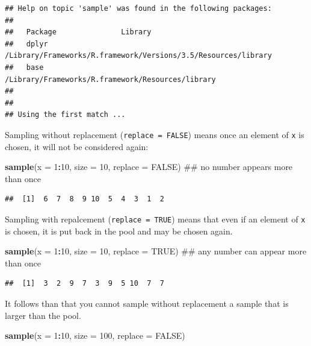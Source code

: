 \documentclass[]{book}
\newenvironment{Shaded}{\begin{snugshade}}{\end{snugshade}}
\newcommand{\KeywordTok}[1]{\textcolor[rgb]{0.13,0.29,0.53}{\textbf{#1}}}
\newcommand{\DataTypeTok}[1]{\textcolor[rgb]{0.13,0.29,0.53}{#1}}
\newcommand{\DecValTok}[1]{\textcolor[rgb]{0.00,0.00,0.81}{#1}}
\newcommand{\OtherTok}[1]{\textcolor[rgb]{0.56,0.35,0.01}{#1}}
\newcommand{\OperatorTok}[1]{\textcolor[rgb]{0.81,0.36,0.00}{\textbf{#1}}}
\newcommand{\NormalTok}[1]{#1}
\theoremstyle{definition}
\theoremstyle{definition}
\theoremstyle{definition}
\theoremstyle{remark}
\begin{document}
\begin{verbatim}
## Help on topic 'sample' was found in the following packages:
## 
##   Package               Library
##   dplyr                 /Library/Frameworks/R.framework/Versions/3.5/Resources/library
##   base                  /Library/Frameworks/R.framework/Resources/library
## 
## 
## Using the first match ...
\end{verbatim}

Sampling without replacement (\texttt{replace\ =\ FALSE}) means once an
element of \texttt{x} is chosen, it will not be considered again:

\begin{Shaded}
\begin{Highlighting}[]
\KeywordTok{sample}\NormalTok{(}\DataTypeTok{x =} \DecValTok{1}\OperatorTok{:}\DecValTok{10}\NormalTok{, }\DataTypeTok{size =} \DecValTok{10}\NormalTok{, }\DataTypeTok{replace =} \OtherTok{FALSE}\NormalTok{) ## no number appears more than once}
\end{Highlighting}
\end{Shaded}

\begin{verbatim}
##  [1]  6  7  8  9 10  5  4  3  1  2
\end{verbatim}

Sampling with repalcement (\texttt{replace\ =\ TRUE}) means that even if
an element of \texttt{x} is chosen, it is put back in the pool and may
be chosen again.

\begin{Shaded}
\begin{Highlighting}[]
\KeywordTok{sample}\NormalTok{(}\DataTypeTok{x =} \DecValTok{1}\OperatorTok{:}\DecValTok{10}\NormalTok{, }\DataTypeTok{size =} \DecValTok{10}\NormalTok{, }\DataTypeTok{replace =} \OtherTok{TRUE}\NormalTok{) ## any number can appear more than once}
\end{Highlighting}
\end{Shaded}

\begin{verbatim}
##  [1]  3  2  9  7  3  9  5 10  7  7
\end{verbatim}

It follows than that you cannot sample without replacement a sample that
is larger than the pool.

\begin{Shaded}
\begin{Highlighting}[]
\KeywordTok{sample}\NormalTok{(}\DataTypeTok{x =} \DecValTok{1}\OperatorTok{:}\DecValTok{10}\NormalTok{, }\DataTypeTok{size =} \DecValTok{100}\NormalTok{, }\DataTypeTok{replace =} \OtherTok{FALSE}\NormalTok{)}
\end{Highlighting}
\end{Shaded}
\end{document}
